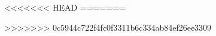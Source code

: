 
%

%

\newpage

\newpage

\newpage
<<<<<<< HEAD
%
=======

>>>>>>> 0c5944c722f4fc0f3311b6c334ab84ef26ee3309
\newpage


%
\newpage 
%
\newpage